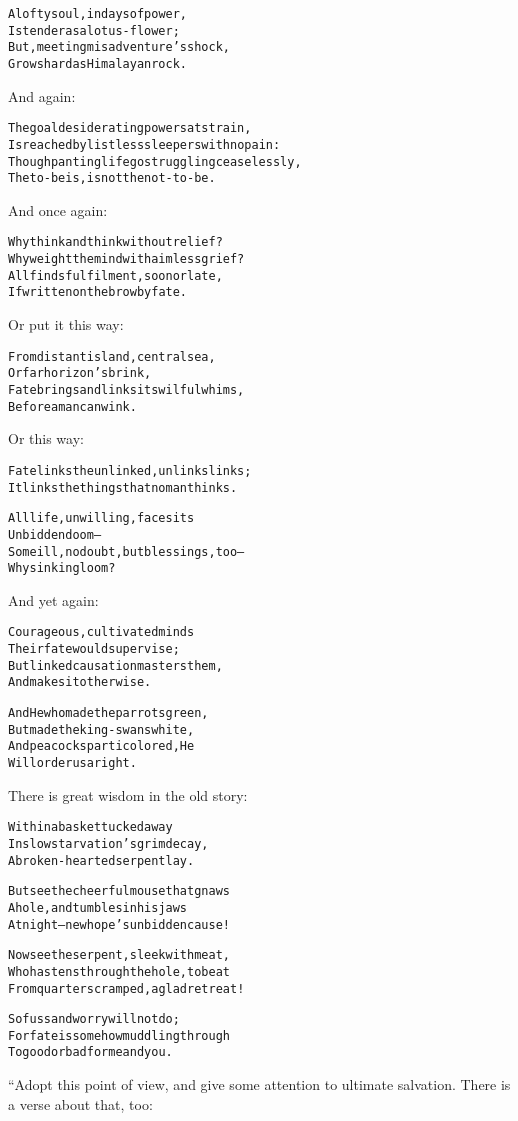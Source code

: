 \documentclass{article}
\renewenvironment{verbatim}{\begin{alltt}\normalfont\begin{centering}}{\end{centering}\end{alltt}}
\begin{document}
\begin{verbatim}
A lofty soul, in days of power,
Is tender as a lotus-flower;
But, meeting misadventure's shock,
Grows hard as Himalayan rock.
\end{verbatim}
And again:

\begin{verbatim}
The goal desiderating powers at strain,
Is reached by listless sleepers with no pain:
Though panting life go struggling ceaselessly,
The to-be is, is not the not-to-be.
\end{verbatim}
And once again:

\begin{verbatim}
Why think and think without relief?
Why weight the mind with aimless grief?
All finds fulfilment, soon or late,
If written on the brow by fate.
\end{verbatim}
Or put it this way:

\begin{verbatim}
From distant island, central sea,
Or far horizon's brink,
Fate brings and links its wilful whims,
Before a man can wink.
\end{verbatim}
Or this way:

\begin{verbatim}
Fate links the unlinked, unlinks links;
It links the things that no man thinks.

All life, unwilling, faces its
    Unbidden doom--
Some ill, no doubt, but blessings, too--
    Why sink in gloom?
\end{verbatim}
And yet again:

\begin{verbatim}
Courageous, cultivated minds
    Their fate would supervise;
But linked causation masters them,
    And makes it otherwise.

And He who made the parrots green,
    But made the king-swans white,
And peacocks particolored, He
    Will order us aright.
\end{verbatim}
There is great wisdom in the old story:

\begin{verbatim}
Within a basket tucked away
In slow starvation's grim decay,
A broken-hearted serpent lay.

But see the cheerful mouse that gnaws
A hole, and tumbles in his jaws
At night--new hope's unbidden cause!

Now see the serpent, sleek with meat,
Who hastens through the hole, to beat
From quarters cramped, a glad retreat!

So fuss and worry will not do;
For fate is somehow muddling through
To good or bad for me and you.
\end{verbatim}
“Adopt this point of view, and give some attention to ultimate
salvation. There is a verse about that, too:
\end{document}
